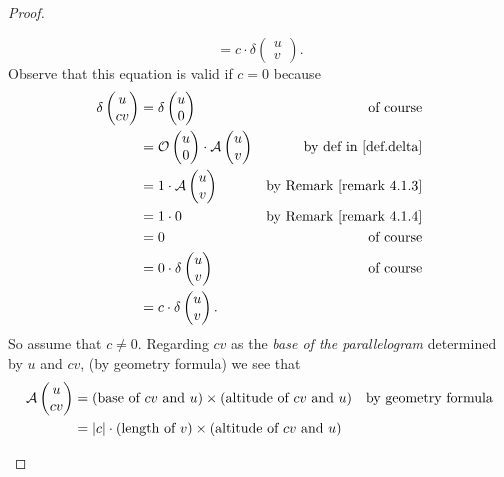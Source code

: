 \begin{proof}
\begin{enumerate}
\[    = c \cdot \delta \begin{pmatrix} u \\ v \end{pmatrix}.
\]
Observe that this equation is valid if \(c = 0\) because
\begin{align*}
    \delta \begin{pmatrix} u \\ cv \end{pmatrix}
        & = \delta \begin{pmatrix} u \\ 0 \end{pmatrix} & \text{of course} \\
        & = \mathcal{O}\begin{pmatrix} u \\ 0 \end{pmatrix} \cdot \mathcal{A}\begin{pmatrix} u \\ v \end{pmatrix} & \text{by def in \ref{def.delta}} \\
        & = 1 \cdot \mathcal{A}\begin{pmatrix} u \\ v \end{pmatrix} & \text{by \RMK{4.1.3}} \\
        & = 1 \cdot 0 & \text{by \RMK{4.1.4}} \\
        & = 0 & \text{of course} \\
        & = 0 \cdot \delta \begin{pmatrix} u \\ v \end{pmatrix} & \text{of course} \\
        & = c \cdot \delta \begin{pmatrix} u \\ v \end{pmatrix}.
\end{align*}
So assume that \(c \ne 0\).
Regarding \(cv\) as the \emph{base of the parallelogram} determined by \(u\) and \(cv\), (by geometry formula) we see that
\begin{align*}
    \mathcal{A}\begin{pmatrix}
        u \\ cv
    \end{pmatrix}
    & = \text{(base of \(cv\) and \(u\))} \X \text{(altitude of \(cv\) and \(u\))} & \text{by geometry formula} \\
    & = \abs{c} \cdot (\text{length of } v) \X (\text{altitude of \(cv\) and \(u\)}) \\

\end{align*}
\end{enumerate}
\end{proof}
